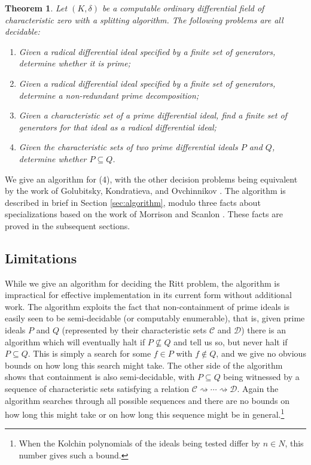 \documentclass[12pt]{amsart}
\newtheorem{theorem}{Theorem}[section]
\theoremstyle{definition}
\numberwithin{subcase}{cases}
\theoremstyle{remark}
\newcommand{\mc}[1]{\mathcal{#1}}
\begin{document}
\begin{theorem}
    Let $(K,\delta)$ be a computable ordinary differential field of characteristic zero with a splitting algorithm. The following problems are all decidable:
\begin{enumerate}
    \item Given a radical differential ideal specified by a finite set of generators, determine whether it is prime;
    \item Given a radical differential ideal specified by a finite set of generators, determine a non-redundant prime decomposition;
    \item Given a characteristic set of a prime differential ideal, find a finite set of generators for that ideal as a radical differential ideal;
    \item Given the characteristic sets of two prime differential ideals $P$ and $Q$, determine whether $P \subseteq Q$.
\end{enumerate}
\end{theorem}

We give an algorithm for (4), with the other decision problems being equivalent by the work of Golubitsky, Kondratieva, and Ovchinnikov \cite{GolubitskyKondratievaOvchinnikov09}. The algorithm is described in brief in Section \ref{sec:algorithm}, modulo three facts about specializations based on the work of Morrison \cite{Morrison78,Morrison79} and Scanlon \cite{Scanlon00}. These facts are proved in the subsequent sections.

\subsection{Limitations}

While we give an algorithm for deciding the Ritt problem, the algorithm is impractical for effective implementation in its current form without additional work. The algorithm exploits the fact that non-containment of prime ideals is easily seen to be semi-decidable (or computably enumerable), that is, given prime ideals $P$ and $Q$ (represented by their characteristic sets $\mc{C}$ and $\mc{D}$) there is an algorithm which will eventually halt if $P \nsubseteq Q$ and tell us so, but never halt if $P \subseteq Q$. This is simply a search for some $f \in P$ with $f \notin Q$, and we give no obvious bounds on how long this search might take. The other side of the algorithm shows that containment is also semi-decidable, with $P \subseteq Q$ being witnessed by a sequence of characteristic sets satisfying a relation $\mc{C} \rightsquigarrow \cdots \rightsquigarrow \mc{D}$. Again the algorithm searches through all possible sequences and there are no bounds on how long this might take or on how long this sequence might be in general.\footnote{When the Kolchin polynomials of the ideals being tested differ by $n \in N$, this number gives such a bound.} 
\end{document}
